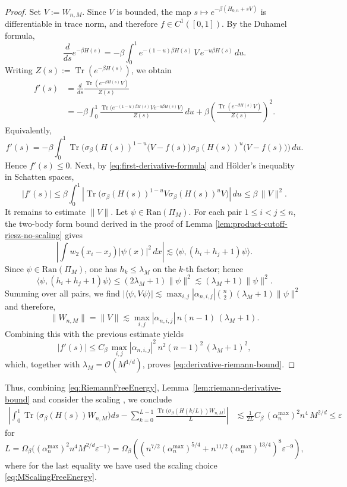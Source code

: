 \documentclass[11pt]{amsart}
\newcommand{\1}{\mathbbm{1}}
\newcommand{\Tr}{\operatorname{Tr}}
\theoremstyle{plain}
\theoremstyle{definition}
\theoremstyle{remark}
\numberwithin{equation}{section}
\begin{document}
\begin{proof}
Set \(V:=W_{n,M}\). Since \(V\) is bounded, the map
$
s\longmapsto e^{-\beta(H_{0,n}+sV)}
$
is differentiable in trace norm, and therefore \(f\in C^1([0,1])\). By the Duhamel formula,
\[
\frac{d}{ds}e^{-\beta H(s)}
=
-\beta\int_0^1 e^{-(1-u)\beta H(s)}\,V\,e^{-u\beta H(s)}\,du.
\]
Writing \(Z(s):=\Tr(e^{-\beta H(s)})\), we obtain
\begin{align}
f'(s)
&=
\frac{d}{ds}\frac{\Tr(e^{-\beta H(s)}V)}{Z(s)}
\nonumber\\
&=
-\beta\int_0^1
\frac{\Tr\!\big(e^{-(1-u)\beta H(s)}V e^{-u\beta H(s)}V\big)}{Z(s)}\,du
+\beta\left(\frac{\Tr(e^{-\beta H(s)}V)}{Z(s)}\right)^2.
\label{eq:first-derivative-formula}
\end{align}
Equivalently,
\begin{equation}
\label{eq:centered-derivative-formula}
f'(s)
=
-\beta\int_0^1
\Tr\!\Big(
\sigma_\beta(H(s))^{1-u}\big(V-f(s)\big)\sigma_\beta(H(s))^{u}\big(V-f(s)\big)
\Big)\,du.
\end{equation}
Hence \(f'(s)\le 0\). Next, by \eqref{eq:first-derivative-formula} and Hölder's inequality in Schatten spaces,
\[
|f'(s)|
\le
\beta\int_0^1
\left|
\Tr\!\big(\sigma_\beta(H(s))^{1-u}V\sigma_\beta(H(s))^uV\big)
\right|\,du
\le
\beta\,\|V\|^2.
\]
It remains to estimate \(\|V\|\). Let \(\psi\in \mathrm{Ran}(\Pi_M)\). For each pair \(1\le i<j\le n\), the two-body form bound derived in the proof of Lemma \ref{lem:product-cutoff-riesz-no-scaling} gives
\[
\left|
\int w_2(x_i-x_j)|\psi(x)|^2\,dx
\right|
\lesssim
\langle \psi,(h_i+h_j+1)\psi\rangle.
\]
Since \(\psi\in \mathrm{Ran}(\Pi_M)\), one has \(h_k\le \lambda_M\) on the \(k\)-th factor; hence
\[
\langle \psi,(h_i+h_j+1)\psi\rangle
\le
(2\lambda_M+1)\|\psi\|^2
\lesssim
(\lambda_M+1)\|\psi\|^2.
\]
Summing over all pairs, we find $|\langle \psi,V\psi\rangle|
\lesssim
\max_{i,j}|\alpha_{n,i,j}|\binom{n}{2}(\lambda_M+1)\|\psi\|^2$ and therefore,
\begin{equation}
\label{eq:NormTruncatedCoulomb}
\|W_{n,M}\| =\|V\|
\lesssim
\max_{i,j}|\alpha_{n,i,j}|\,n(n-1)\,(\lambda_M+1).
\end{equation}
Combining this with the previous estimate yields
\[
|f'(s)|
\le
C_\beta\,\max_{i,j}|\alpha_{n,i,j}|^2\,n^2(n-1)^2\,(\lambda_M+1)^2,
\]
which, together with \(\lambda_M=\mathcal O(M^{1/d})\), proves \eqref{eq:derivative-riemann-bound}.
\end{proof}

\noindent Thus, combining \eqref{eq:RiemannFreeEnergy}, Lemma~\ref{lem:riemann-derivative-bound} and consider the scaling , we conclude
\begin{align}
\label{eq:RiemannConclusion}
\left|\int_0^1\!\Tr\Big(\sigma_\beta(H(s))W_{n,M} \Big)ds\!-\!\sum_{k=0}^{L-1}\frac{\Tr\Big(\sigma_\beta(H(k/L))W_{n,M} \Big)}{L}\right|&\!\lesssim \frac{1}{2L}C_\beta\,(\alpha^{\max}_n)^2 n^4\,M^{2/d}\le \varepsilon
\end{align}
for $L=\Omega_\beta\Big((\alpha^{\max}_n)^2n^4M^{2/d}\varepsilon^{-1} \Big)=\Omega_\beta\left(\left(n^{7/2}(\alpha^{\max}_n)^{5/4} + n^{11/2}(\alpha^{\max}_n)^{13/4}\right)^8\varepsilon^{-9}\right),$ where for the last equality we have used the scaling choice \eqref{eq:MScalingFreeEnergy}.
\end{document}
